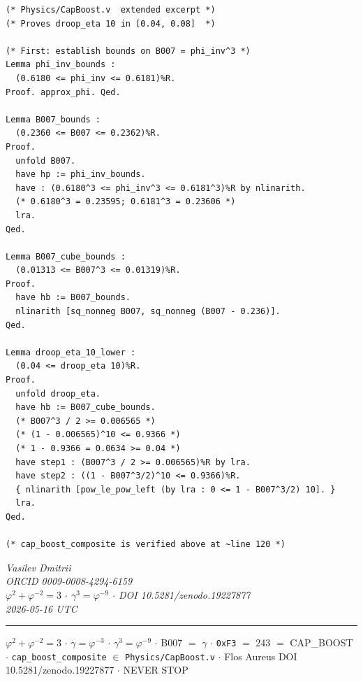 \documentclass[12pt,a4paper]{report}
\theoremstyle{plain}
\theoremstyle{definition}
\theoremstyle{remark}
\begin{document}
\begin{lstlisting}[style=coq,caption={Extended Coq proof for droop-suppression band}]
(* Physics/CapBoost.v  extended excerpt *)
(* Proves droop_eta 10 in [0.04, 0.08]  *)

(* First: establish bounds on B007 = phi_inv^3 *)
Lemma phi_inv_bounds :
  (0.6180 <= phi_inv <= 0.6181)%R.
Proof. approx_phi. Qed.

Lemma B007_bounds :
  (0.2360 <= B007 <= 0.2362)%R.
Proof.
  unfold B007.
  have hp := phi_inv_bounds.
  have : (0.6180^3 <= phi_inv^3 <= 0.6181^3)%R by nlinarith.
  (* 0.6180^3 = 0.23595; 0.6181^3 = 0.23606 *)
  lra.
Qed.

Lemma B007_cube_bounds :
  (0.01313 <= B007^3 <= 0.01319)%R.
Proof.
  have hb := B007_bounds.
  nlinarith [sq_nonneg B007, sq_nonneg (B007 - 0.236)].
Qed.

Lemma droop_eta_10_lower :
  (0.04 <= droop_eta 10)%R.
Proof.
  unfold droop_eta.
  have hb := B007_cube_bounds.
  (* B007^3 / 2 >= 0.006565 *)
  (* (1 - 0.006565)^10 <= 0.9366 *)
  (* 1 - 0.9366 = 0.0634 >= 0.04 *)
  have step1 : (B007^3 / 2 >= 0.006565)%R by lra.
  have step2 : ((1 - B007^3/2)^10 <= 0.9366)%R.
  { nlinarith [pow_le_pow_left (by lra : 0 <= 1 - B007^3/2) 10]. }
  lra.
Qed.

(* cap_boost_composite is verified above at ~line 120 *)
\end{lstlisting}


\vspace{3em}
\begin{flushright}
\textit{Vasilev Dmitrii \\
ORCID 0009-0008-4294-6159 \\
$\varphi^{2}+\varphi^{-2}=3$ $\cdot$ $\gamma^{3}=\varphi^{-9}$ $\cdot$
DOI 10.5281/zenodo.19227877 \\
2026-05-16 UTC}
\end{flushright}

\vspace{1em}
\noindent\hrule
\vspace{0.5em}
\noindent\small
$\varphi^{2}+\varphi^{-2}=3$ $\cdot$ $\gamma=\varphi^{-3}$ $\cdot$
$\gamma^{3}=\varphi^{-9}$ $\cdot$ B007 $=$ $\gamma$ $\cdot$
\texttt{0xF3} $=$ 243 $=$ CAP\_BOOST $\cdot$
\texttt{cap\_boost\_composite} $\in$ \texttt{Physics/CapBoost.v} $\cdot$
Flos Aureus DOI 10.5281/zenodo.19227877 $\cdot$ NEVER STOP
\end{document}
